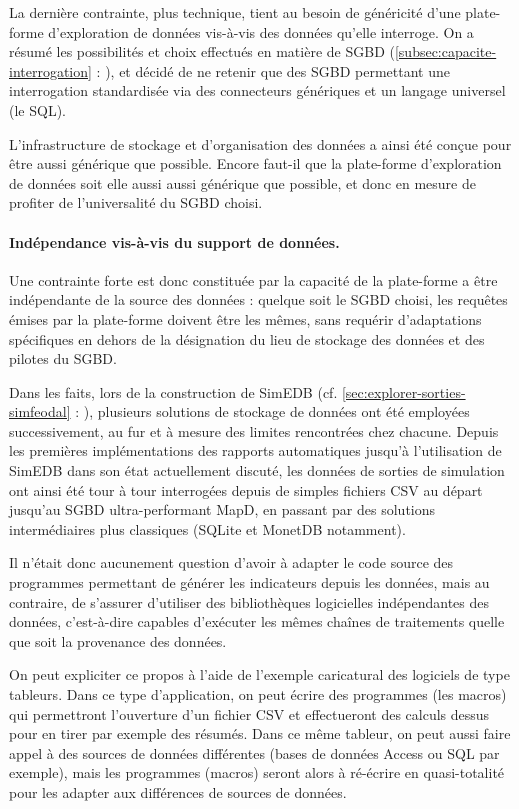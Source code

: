 La dernière contrainte, plus technique, tient au besoin de généricité d'une plate-forme d'exploration de données vis-à-vis des données qu'elle interroge.
On a résumé les possibilités et choix effectués en matière de SGBD (\cref{subsec:capacite-interrogation} :  \og {}\fg{}), et décidé de ne retenir que des SGBD permettant une interrogation standardisée via des connecteurs génériques et un langage universel (le SQL).

L'infrastructure de stockage et d'organisation des données a ainsi été conçue pour être aussi générique que possible.
Encore faut-il que la plate-forme d'exploration de données soit elle aussi aussi générique que possible, et donc en mesure de profiter de l'universalité du SGBD choisi.

\paragraph{Indépendance vis-à-vis du support de données.}
Une contrainte forte est donc constituée par la capacité de la plate-forme a être indépendante de la source des données : quelque soit le SGBD choisi, les requêtes émises par la plate-forme doivent être les mêmes, sans requérir d'adaptations spécifiques en dehors de la désignation du lieu de stockage des données	et des pilotes du SGBD.

Dans les faits, lors de la construction de SimEDB (cf. \cref{sec:explorer-sorties-simfeodal} : \og {}\fg{}), plusieurs solutions de stockage de données ont été employées successivement, au fur et à mesure des limites rencontrées chez chacune.
Depuis les premières implémentations des rapports automatiques jusqu'à l'utilisation de SimEDB dans son état actuellement discuté, les données de sorties de simulation ont ainsi été tour à tour interrogées depuis de simples fichiers CSV au départ jusqu'au SGBD ultra-performant MapD, en passant par des solutions intermédiaires plus classiques (SQLite et MonetDB notamment).

Il n'était donc aucunement question d'avoir à adapter le code source des programmes permettant de générer les indicateurs depuis les données, mais au contraire, de s'assurer d'utiliser des bibliothèques logicielles indépendantes des données, c'est-à-dire capables d'exécuter les mêmes chaînes de traitements quelle que soit la provenance des données.

On peut expliciter ce propos à l'aide de l'exemple caricatural des logiciels de type tableurs.
Dans ce type d'application, on peut écrire des programmes (les \og macros\fg{}) qui permettront l'ouverture d'un fichier CSV et effectueront des calculs dessus pour en tirer par exemple des résumés.
Dans ce même tableur, on peut aussi faire appel à des sources de données différentes (bases de données Access ou SQL par exemple), mais les programmes (macros) seront alors à ré-écrire en quasi-totalité pour les adapter aux différences de sources de données.

